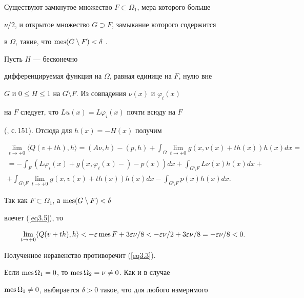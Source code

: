 Существуют замкнутое множество $F \subset \Omega_1$, мера которого больше


$\nu /2$, и открытое множество $G \supset F$, замыкание которого содержится


в $\Omega$, такие, что $\operatorname{mes}(G \setminus F)<\delta$ \cite{n14}.


Пусть $H$ --- бесконечно


дифференцируемая функция на $\Omega$, равная единице на $F$, нулю вне


$G$ и $0\le H \le1$ на $G\setminus F$. Из совпадения $\nu(x)$ и $\varphi_i(x)$


на $F$ следует, что $Lu(x)=L \varphi_i(x)$ почти всюду на $F$


(\cite{n25}, с.\,151). Отсюда для $h(x)=-H(x)$ получим


\begin{multline*}


\lim_{t \to +0} \langle Q(v+th),h \rangle = (A\nu,h)-(p,h)+\int_\Omega


\lim\limits_{t \to +0} g(x,v(x)+th(x)) h(x) dx = \\


%


=-\int_F(L\varphi_i(x)+g(x,\varphi_i(x)-)-p(x))dx+


\int_{G \setminus F} L\nu(x) h(x)dx+ \\


%


+\int_{G \setminus F}\lim\limits_{t \to +0} g(x,v(x)+th(x)) h(x) dx-


\int_{G \setminus F} p(x) h(x)dx.


\end{multline*}


Так как $F \subset \Omega_1$, а $\operatorname{mes}(G \setminus F)<\delta$


влечет (\ref{eq3.5}), то


$$


\lim_{t \to +0} \langle Q(v+th),h \rangle <-\varepsilon


\mes F+3\varepsilon\nu/8<


-\varepsilon\nu/2+3\varepsilon\nu/8=-\varepsilon\nu/8<0.


$$


Полученное неравенство противоречит (\ref{eq3.3}).





Если $\operatorname{mes}\Omega_1=0$, то $\operatorname{mes}\Omega_2=\nu \ne0$. Как и в случае


$\operatorname{mes}\Omega_1\ne0$, выбирается $\delta>0$ такое, что для любого измеримого



